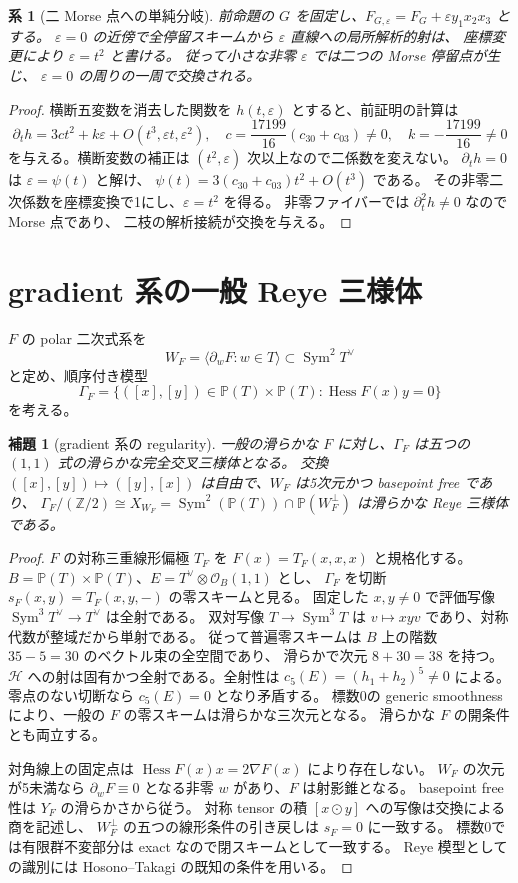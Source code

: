 \documentclass[11pt,a4paper]{ltjsarticle}
\newtheorem{lemma}[theorem]{補題}
\newtheorem{corollary}[theorem]{系}
\newcommand{\PP}{\mathbb P}
\newcommand{\OO}{\mathcal O}
\newcommand{\Sym}{\operatorname{Sym}}
\newcommand{\cH}{\mathcal H}
\newcommand{\Hess}{\operatorname{Hess}}
\begin{document}
\begin{corollary}[二 Morse 点への単純分岐]
前命題の $G$ を固定し、$F_{G,\varepsilon}=F_G+\varepsilon y_1x_2x_3$ とする。
$\varepsilon=0$ の近傍で全停留スキームから $\varepsilon$ 直線への局所解析的射は、
座標変更により $\varepsilon=t^2$ と書ける。
従って小さな非零 $\varepsilon$ では二つの Morse 停留点が生じ、
$\varepsilon=0$ の周りの一周で交換される。
\end{corollary}
\begin{proof}
横断五変数を消去した関数を $h(t,\varepsilon)$ とすると、前証明の計算は
\[
 \partial_th=3ct^2+k\varepsilon+O(t^3,\varepsilon t,\varepsilon^2),\quad
 c=\frac{17199}{16}(c_{30}+c_{03})\ne0,\quad
 k=-\frac{17199}{16}\ne0
\]
を与える。横断変数の補正は $(t^2,\varepsilon)$ 次以上なので二係数を変えない。
$\partial_th=0$ は $\varepsilon=\psi(t)$ と解け、
$\psi(t)=3(c_{30}+c_{03})t^2+O(t^3)$ である。
その非零二次係数を座標変換で1にし、$\varepsilon=t^2$ を得る。
非零ファイバーでは $\partial_t^2h\ne0$ なので Morse 点であり、
二枝の解析接続が交換を与える。
\end{proof}

\section{gradient 系の一般 Reye 三様体}
$F$ の polar 二次式系を
\[
 W_F=\langle\partial_wF:w\in T\rangle\subset\Sym^2T^\vee
\]
と定め、順序付き模型
\[
 \Gamma_F=\{([x],[y])\in\PP(T)\times\PP(T):
 \Hess F(x)y=0\}
\]
を考える。
\begin{lemma}[gradient 系の regularity]\label{lem:ReyeReg}
一般の滑らかな $F$ に対し、$\Gamma_F$ は五つの $(1,1)$ 式の滑らかな完全交叉三様体となる。
交換 $([x],[y])\mapsto([y],[x])$ は自由で、$W_F$ は5次元かつ basepoint free であり、
$\Gamma_F/(\mathbb Z/2)\cong
 X_{W_F}=\Sym^2(\PP(T))\cap\PP(W_F^\perp)$ は滑らかな Reye 三様体である。
\end{lemma}
\begin{proof}
$F$ の対称三重線形偏極 $T_F$ を $F(x)=T_F(x,x,x)$ と規格化する。
$B=\PP(T)\times\PP(T)$、$E=T^\vee\otimes\OO_B(1,1)$ とし、
$\Gamma_F$ を切断 $s_F(x,y)=T_F(x,y,-)$ の零スキームと見る。
固定した $x,y\ne0$ で評価写像 $\Sym^3T^\vee\to T^\vee$ は全射である。
双対写像 $T\to\Sym^3T$ は $v\mapsto xyv$ であり、対称代数が整域だから単射である。
従って普遍零スキームは $B$ 上の階数 $35-5=30$ のベクトル束の全空間であり、
滑らかで次元 $8+30=38$ を持つ。
$\cH$ への射は固有かつ全射である。全射性は
$c_5(E)=(h_1+h_2)^5\ne0$ による。零点のない切断なら $c_5(E)=0$ となり矛盾する。
標数0の generic smoothness により、一般の $F$ の零スキームは滑らかな三次元となる。
滑らかな $F$ の開条件とも両立する。

対角線上の固定点は $\Hess F(x)x=2\nabla F(x)$ により存在しない。
$W_F$ の次元が5未満なら $\partial_wF\equiv0$ となる非零 $w$ があり、$F$ は射影錐となる。
basepoint free 性は $Y_F$ の滑らかさから従う。
対称 tensor の積 $[x\odot y]$ への写像は交換による商を記述し、
$W_F^\perp$ の五つの線形条件の引き戻しは $s_F=0$ に一致する。
標数0では有限群不変部分は exact なので閉スキームとして一致する。
Reye 模型としての識別には Hosono--Takagi\cite[Proposition 2.1]{HT} の既知の条件を用いる。
\end{proof}
\end{document}
